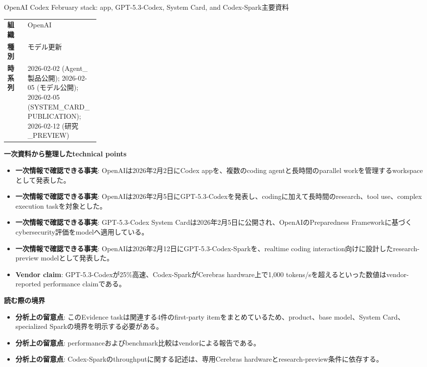 \begin{technicalnote}{OpenAI Codex February stack: app, GPT-5.3-Codex, System Card, and Codex-Spark}{主要資料}
\begingroup
\begin{tabularx}{\linewidth}{@{}>{\bfseries}p{0.22\linewidth}X@{}}
組織 & OpenAI \\
種別 & モデル更新 \\
時系列 & 2026-02-02 (Agent\_製品公開); 2026-02-05 (モデル公開); 2026-02-05 (SYSTEM\_CARD\_PUBLICATION); 2026-02-12 (研究\_PREVIEW) \\
\end{tabularx}
\smallskip
{\bfseries 一次資料から整理したtechnical points}
\begin{itemize}[leftmargin=1.5em,itemsep=0.35em]
\item \textbf{一次情報で確認できる事実}: OpenAIは2026年2月2日にCodex appを、複数のcoding agentと長時間のparallel workを管理するworkspaceとして発表した。
\item \textbf{一次情報で確認できる事実}: OpenAIは2026年2月5日にGPT-5.3-Codexを発表し、codingに加えて長時間のresearch、tool use、complex execution taskを対象とした。
\item \textbf{一次情報で確認できる事実}: GPT-5.3-Codex System Cardは2026年2月5日に公開され、OpenAIのPreparedness Frameworkに基づくcybersecurity評価をmodelへ適用している。
\item \textbf{一次情報で確認できる事実}: OpenAIは2026年2月12日にGPT-5.3-Codex-Sparkを、realtime coding interaction向けに設計したresearch-preview modelとして発表した。
\item \textbf{Vendor claim}: GPT-5.3-Codexが25\%高速、Codex-SparkがCerebras hardware上で1,000 tokens/sを超えるといった数値はvendor-reported performance claimである。
\end{itemize}
\begin{minipage}{\linewidth}
{\bfseries 読む際の境界}
\begin{itemize}[leftmargin=1.5em,itemsep=0.35em]
\item \textbf{分析上の留意点}: このEvidence taskは関連する4件のfirst-party itemをまとめているため、product、base model、System Card、specialized Sparkの境界を明示する必要がある。
\item \textbf{分析上の留意点}: performanceおよびbenchmark比較はvendorによる報告である。
\item \textbf{分析上の留意点}: Codex-Sparkのthroughputに関する記述は、専用Cerebras hardwareとresearch-preview条件に依存する。

\end{itemize}
\end{minipage}
\end{technicalnote}
